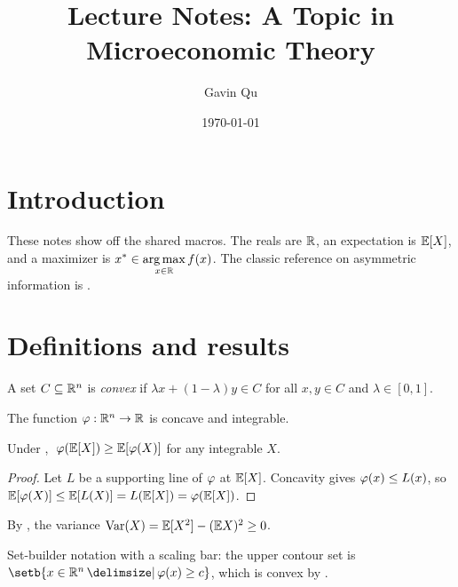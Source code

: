 \documentclass[11pt]{article}
\title{Lecture Notes: A Topic in Microeconomic Theory}
\author{Gavin Qu}
\date{\today}
\begin{document}
\maketitle
\tableofcontents
\bigskip

\section{Introduction}
These notes show off the shared macros. The reals are \(\mathbb{R}\), an expectation is
\(\mathbb{E}[X]\), and a maximizer is \(\displaystyle x^{*} \in \operatorname*{arg\,max}_{x \in \mathbb{R}} f(x)\).
The classic reference on asymmetric information is \textcite{akerlof1970}.

\section{Definitions and results}

\begin{definition}\label{def:convex}
A set \(C \subseteq \mathbb{R}^{n}\) is \emph{convex} if
\(\lambda x + (1-\lambda) y \in C\) for all \(x,y \in C\) and \(\lambda \in [0,1]\).
\end{definition}

\begin{assumption}\label{as:concave}
The function \(\varphi : \mathbb{R}^{n} \to \mathbb{R}\) is concave and integrable.
\end{assumption}

\begin{theorem}\label{thm:jensen}
Under , \(\;\varphi(\mathbb{E}[X]) \ge \mathbb{E}[\varphi(X)]\) for any integrable \(X\).
\end{theorem}

\begin{proof}
Let \(L\) be a supporting line of \(\varphi\) at \(\mathbb{E}[X]\). Concavity gives
\(\varphi(x) \le L(x)\), so \(\mathbb{E}[\varphi(X)] \le \mathbb{E}[L(X)] = L(\mathbb{E}[X]) = \varphi(\mathbb{E}[X])\).
\end{proof}

By , the variance \(\operatorname{Var}(X) = \mathbb{E}[X^2] - (\mathbb{E} X)^2 \ge 0\).

\begin{remark}
Set-builder notation with a scaling bar: the upper contour set is
\(\setb{x \in \R^{n} \given \ph(x) \ge c}\), which is convex by .
\end{remark}

\printrefs
\end{document}
